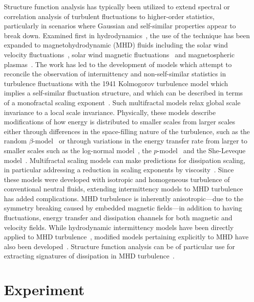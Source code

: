 \documentclass[preprint2]{aastex}
\begin{document}
Structure function analysis has typically been utilized to extend spectral or correlation analysis of turbulent fluctuations to higher-order statistics, particularly in scenarios where Gaussian and self-similar properties appear to break down. Examined first in hydrodynamics~\citep{anselmet1984,frisch1995}, the use of the technique has been expanded to magnetohydrodynamic (MHD) fluids including the solar wind velocity fluctuations~\citep{burlaga1991}, solar wind magnetic fluctuations~\citep{burlaga1992,tu1995} and magnetospheric plasmas~\citep{consolini1996,hnat2003}. The work has led to the development of models which attempt to reconcile the observation of intermittency and non-self-similar statistics in turbulence fluctuations with the 1941 Kolmogorov turbulence model which implies a self-similar fluctuation structure, and which can be described in terms of a monofractal scaling exponent~\citep{kolmogorov1941,frisch1995}. Such multifractal models relax global scale invariance to a local scale invariance. Physically, these models describe modifications of how energy is distributed to smaller scales from larger scales either through differences in the space-filling nature of the turbulence, such as the random $\beta$-model~\citep{benzi1984} or through variations in the energy transfer rate from larger to smaller scales such as the log-normal model~\citep{kolmogorov1962}, the $p$-model~\citep{meneveau1987} and the She-Leveque model~\citep{she1994,dubrulle1994}. Multifractal scaling models can make predictions for dissipation scaling, in particular addressing a reduction in scaling exponents by viscosity~\citep{frisch1991,chevillard2005}. Since these models were developed with isotropic and homogeneous turbulence of conventional neutral fluids, extending intermittency models to MHD turbulence has added complications. MHD turbulence is inherently anisotropic---due to the symmetry breaking caused by embedded magnetic fields---in addition to having fluctuations, energy transfer and dissipation channels for both magnetic and velocity fields. While hydrodynamic intermittency models have been directly applied to MHD turbulence~\citep{burlaga1991,pagel2002}, modified models pertaining explicitly to MHD have also been developed~\citep{carbone1993,biskamp1994,muller2000,biskamp2000,boldyrev2002,cho2003}. Structure function analysis can be of particular use for extracting signatures of dissipation in MHD turbulence~\citep{cho2003,alexandrova2008,kiyani2009,kiyani2013}.

\section{Experiment}\label{sec:experiment}
\end{document}
